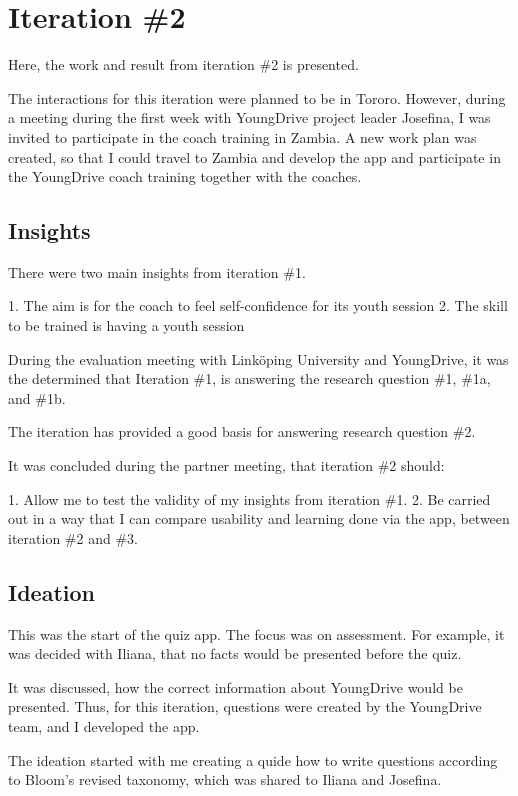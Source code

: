 \section{Iteration \#2}
Here, the work and result from iteration \#2 is presented.

The interactions for this iteration were planned to be in Tororo. However, during a meeting during the first week with YoungDrive project leader Josefina, I was invited to participate in the coach training in Zambia. A new work plan was created, so that I could travel to Zambia and develop the app and participate in the YoungDrive coach training together with the coaches.

\subsection*{Insights}

There were two main insights from iteration \#1.

1. The aim is for the coach to feel self-confidence for its youth session
2. The skill to be trained is having a youth session

During the evaluation meeting with Linköping University and YoungDrive, it was the determined that Iteration \#1, is answering the research question \#1, \#1a, and \#1b.

The iteration has provided a good basis for answering research question \#2.

It was concluded during the partner meeting, that iteration \#2 should:

1. Allow me to test the validity of my insights from iteration \#1.
2. Be carried out in a way that I can compare usability and learning done via the app, between iteration \#2 and \#3.

\subsection*{Ideation}

This was the start of the quiz app. The focus was on assessment. For example, it was decided with Iliana, that no facts would be presented before the quiz. 

It was discussed, how the correct information about YoungDrive would be presented. Thus, for this iteration, questions were created by the YoungDrive team, and I developed the app.

The ideation started with me creating a quide how to write questions according to Bloom's revised taxonomy, which was shared to Iliana and Josefina.

